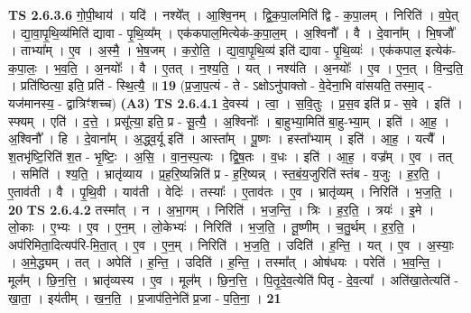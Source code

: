\documentclass[17pt]{extarticle}
\begin{document}
                  \newline
                                \textbf{ TS 2.6.3.6} \newline
                  गो॒पी॒थाय॑ । यदि॑ । नश्ये᳚त् । आ॒श्वि॒नम् । द्वि॒क॒पा॒लमिति॑ द्वि - क॒पा॒लम् । निरिति॑ । व॒पे॒त् । द्या॒वा॒पृ॒थि॒व्य॑मिति॑ द्यावा - पृ॒थि॒व्य᳚म् । एक॑कपाल॒मित्येक॑-क॒पा॒ल॒म् । अ॒श्विनौ᳚ । वै । दे॒वाना᳚म् । भि॒षजौ᳚ । ताभ्या᳚म् । ए॒व । अ॒स्मै॒ । भे॒ष॒जम् । क॒रो॒ति॒ । द्या॒वा॒पृ॒थि॒व्य॑ इति॑ द्यावा - पृ॒थि॒व्यः॑ । एक॑कपाल॒ इत्येक॑-क॒पा॒लः॒ । भ॒व॒ति॒ । अ॒नयोः᳚ । वै । ए॒तत् । न॒श्य॒ति॒ । यत् । नश्य॑ति । अ॒नयोः᳚ । ए॒व । ए॒न॒त् । वि॒न्द॒ति॒ । प्रति॑ष्ठित्या॒ इति॒ प्रति॑ - स्थि॒त्यै॒ ॥ \textbf{  19} \newline
                  \newline
                      (प्र॒जा॒प॒त्यं - ते - ऽक्षोऽनु॑पाक्तो - वे॒देना॒भि वा॑सयति॒ तस्मा॒द् - यज॑मानस्य॒ - द्वात्रिꣳ॑शच्च)  \textbf{(A3)} \newline \newline
                                \textbf{ TS 2.6.4.1} \newline
                  दे॒वस्य॑ । त्वा॒ । स॒वि॒तुः । प्र॒स॒व इति॑ प्र - स॒वे । इति॑ । स्फ्यम् । एति॑ । द॒त्ते॒ । प्रसू᳚त्या॒ इति॒ प्र - सू॒त्यै॒ । अ॒श्विनोः᳚ । बा॒हुभ्या॒मिति॑ बा॒हु-भ्या॒म् । इति॑ । आ॒ह॒ । अ॒श्विनौ᳚ । हि । दे॒वाना᳚म् । अ॒द्ध्व॒र्यू इति॑ । आस्ता᳚म् । पू॒ष्णः । हस्ता᳚भ्याम् । इति॑ । आ॒ह॒ । यत्यै᳚ । श॒तभृ॑ष्टि॒रिति॑ श॒त - भृ॒ष्टिः॒ । अ॒सि॒ । वा॒न॒स्प॒त्यः । द्वि॒ष॒तः । व॒धः । इति॑ । आ॒ह॒ । वज्र᳚म् । ए॒व । तत् । समिति॑ । श्य॒ति॒ । भ्रातृ॑व्याय । प्र॒ह॒रि॒ष्यन्निति॑ प्र - ह॒रि॒ष्यन्न् । स्त॒बं॒य॒जुरिति॑ स्तंब - य॒जुः । ह॒र॒ति॒ । ए॒ताव॑ती । वै । पृ॒थि॒वी । याव॑ती । वेदिः॑ । तस्याः᳚ । ए॒ताव॑तः । ए॒व । भ्रातृ॑व्यम् । निरिति॑ । भ॒ज॒ति॒ । \textbf{  20} \newline
                  \newline
                                \textbf{ TS 2.6.4.2} \newline
                  तस्मा᳚त् । न । अ॒भा॒गम् । निरिति॑ । भ॒ज॒न्ति॒ । त्रिः । ह॒र॒ति॒ । त्रयः॑ । इ॒मे । लो॒काः । ए॒भ्यः । ए॒व । ए॒न॒म् । लो॒केभ्यः॑ । निरिति॑ । भ॒ज॒ति॒ । तू॒ष्णीम् । च॒तु॒र्थम् । ह॒र॒ति॒ । अप॑रिमिता॒दित्यप॑रि-मि॒ता॒त् । ए॒व । ए॒न॒म् । निरिति॑ । भ॒ज॒ति॒ । उदिति॑ । ह॒न्ति॒ । यत् । ए॒व । अ॒स्याः॒ । अ॒मे॒द्ध्यम् । तत् । अपेति॑ । ह॒न्ति॒ । उदिति॑ । ह॒न्ति॒ । तस्मा᳚त् । ओष॑धयः । परेति॑ । भ॒व॒न्ति॒ । मूल᳚म् । छि॒न॒त्ति॒ । भ्रातृ॑व्यस्य । ए॒व । मूल᳚म् । छि॒न॒त्ति॒ । पि॒तृ॒दे॒व॒त्येति॑ पितृ - दे॒व॒त्या᳚ । अति॑खा॒तेत्यति॑ - खा॒ता॒ । इय॑तीम् । ख॒न॒ति॒ । प्र॒जाप॑ति॒नेति॑ प्र॒जा - प॒ति॒ना॒ । \textbf{  21} \newline
\end{document}
